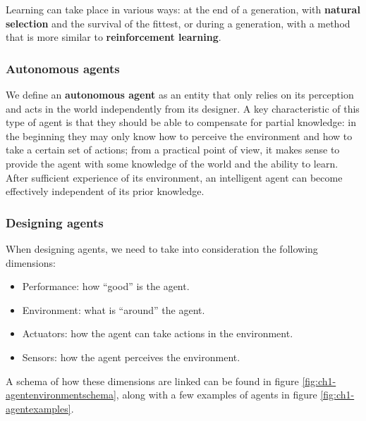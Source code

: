 Learning can take place in various ways: at the end of a generation, with \textbf{natural selection} and the survival of the fittest, or during a generation, with a method that is more similar to \textbf{reinforcement learning}.

\subsubsection{Autonomous agents}
We define an \textbf{autonomous agent} as an entity that only relies on its perception and acts in the world independently from its designer. A key characteristic of this type of agent is that they should be able to compensate for partial knowledge: in the beginning they may only know how to perceive the environment and how to take a certain set of actions; from a practical point of view, it makes sense to provide the agent with some knowledge of the world and the ability to learn. After sufficient experience of its environment, an intelligent agent can become effectively independent of its prior knowledge.

\subsubsection{Designing agents}
When designing agents, we need to take into consideration the following dimensions:
\begin{itemize}
    \item Performance: how ``good'' is the agent.
    \item Environment: what is ``around'' the agent.
    \item Actuators: how the agent can take actions in the environment.
    \item Sensors: how the agent perceives the environment.
\end{itemize}

A schema of how these dimensions are linked can be found in figure \ref{fig:ch1-agentenvironmentschema}, along with a few examples of agents in figure \ref{fig:ch1-agentexamples}.

